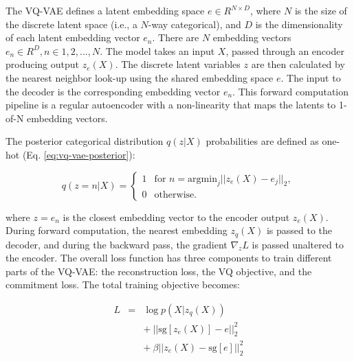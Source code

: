 The \ac{VQ-VAE} defines a latent embedding space $e \in R^{N \times D}$, where $N$ is the size of the discrete latent space (i.e., a $N$-way categorical), and $D$ is the dimensionality of each latent embedding vector $e_n$. There are $N$ embedding vectors $e_n \in R^D, n \in 1, 2, ..., N$. The model takes an input $X$, passed through an encoder producing output $z_e(X)$. The discrete latent variables $z$ are then calculated by the nearest neighbor look-up using the shared embedding space $e$. The input to the decoder is the corresponding embedding vector $e_n$. This forward computation pipeline is a regular autoencoder with a non-linearity that maps the latents to 1-of-N embedding vectors.

The posterior categorical distribution $q(z|X)$ probabilities are defined as one-hot (Eq. \ref{eq:vq-vae-posterior}):

\begin{equation} \label{eq:vq-vae-posterior}
  q(z = n|X) =
  \begin{cases}
    1 & \text{for } n = \text{argmin}_j ||z_e(X)-e_j||_2, \\
    0 & \text{otherwise}.
  \end{cases}
\end{equation}

where $z = e_n$ is the closest embedding vector to the encoder output $z_e(X)$. During forward computation, the nearest embedding $z_q(X)$ is passed to the decoder, and during the backward pass, the gradient $\nabla_z L$ is passed unaltered to the encoder. The overall loss function has three components to train different parts of the \ac{VQ-VAE}: the reconstruction loss, the \ac{VQ} objective, and the commitment loss. The total training objective becomes:

\setlength{\arraycolsep}{0.0em}
\begin{eqnarray}
\label{eq:vq-vae-loss}
\label{eq:reconstruction-loss}L&{}={}&\log p(X|z_q(X))\\
\label{eq:vq-objective}&&{+}\:||\text{sg}[z_e(X)] - e||_2^2\\
\label{eq:commitment-loss}&&{+}\:\beta||z_e(X) - \text{sg}[e]||_2^2
\end{eqnarray}
\setlength{\arraycolsep}{5pt}

